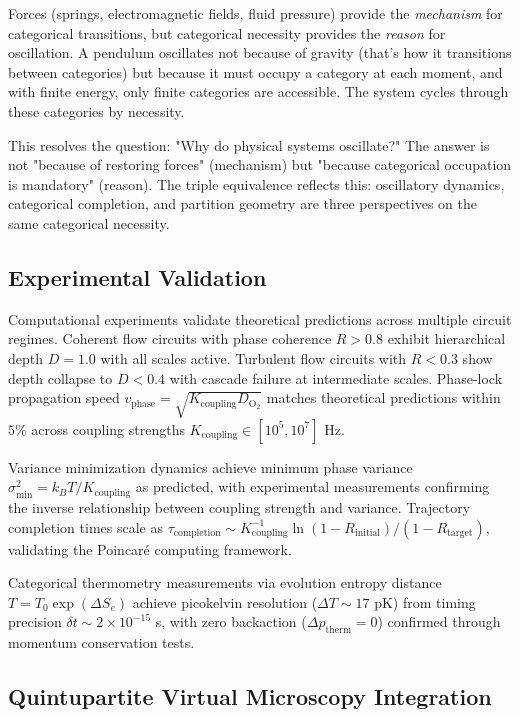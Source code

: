 \documentclass[12pt,a4paper]{article}
\theoremstyle{plain}
\theoremstyle{definition}
\theoremstyle{remark}
\newcommand{\Se}{S_e}
\begin{document}
Forces (springs, electromagnetic fields, fluid pressure) provide the \emph{mechanism} for categorical transitions, but categorical necessity provides the \emph{reason} for oscillation. A pendulum oscillates not because of gravity (that's how it transitions between categories) but because it must occupy a category at each moment, and with finite energy, only finite categories are accessible. The system cycles through these categories by necessity.

This resolves the question: "Why do physical systems oscillate?" The answer is not "because of restoring forces" (mechanism) but "because categorical occupation is mandatory" (reason). The triple equivalence reflects this: oscillatory dynamics, categorical completion, and partition geometry are three perspectives on the same categorical necessity.

\subsection{Experimental Validation}

Computational experiments validate theoretical predictions across multiple circuit regimes. Coherent flow circuits with phase coherence $R > 0.8$ exhibit hierarchical depth $D = 1.0$ with all scales active. Turbulent flow circuits with $R < 0.3$ show depth collapse to $D < 0.4$ with cascade failure at intermediate scales. Phase-lock propagation speed $v_{\text{phase}} = \sqrt{K_{\text{coupling}} D_{\text{O}_2}}$ matches theoretical predictions within $5\%$ across coupling strengths $K_{\text{coupling}} \in [10^5, 10^7]$ Hz.

Variance minimization dynamics achieve minimum phase variance $\sigma^2_{\min} = k_B T / K_{\text{coupling}}$ as predicted, with experimental measurements confirming the inverse relationship between coupling strength and variance. Trajectory completion times scale as $\tau_{\text{completion}} \sim K_{\text{coupling}}^{-1} \ln(1-R_{\text{initial}})/(1-R_{\text{target}})$, validating the Poincaré computing framework.

Categorical thermometry measurements via evolution entropy distance $T = T_0 \exp(\Delta \Se)$ achieve picokelvin resolution ($\Delta T \sim 17$ pK) from timing precision $\delta t \sim 2 \times 10^{-15}$ s, with zero backaction ($\Delta p_{\text{therm}} = 0$) confirmed through momentum conservation tests.

\subsection{Quintupartite Virtual Microscopy Integration}
\end{document}
